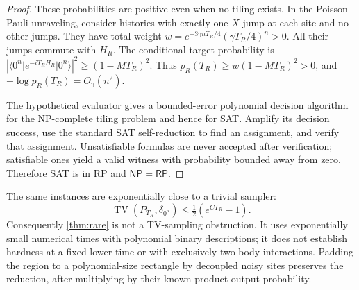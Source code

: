 \documentclass[11pt,reqno]{amsart}
\numberwithin{equation}{section}
\theoremstyle{definition}
\theoremstyle{remark}
\newcommand{\TV}{\operatorname{TV}}
\newcommand{\ket}[1]{\lvert#1\rangle}
\newcommand{\bra}[1]{\langle#1\rvert}
\begin{document}
\begin{proof}
These probabilities are positive even when no tiling exists. In the Poisson Pauli unraveling, consider histories with exactly one $X$ jump at each site and no other jumps. They have total weight
$w=e^{-3\gamma nT_R/4}(\gamma T_R/4)^n>0$.
All their jumps commute with $H_R$. The conditional target probability is
$|\bra{0^n}e^{-iT_RH_R}\ket{0^n}|^2\geq(1-MT_R)^2$.
Thus $p_R(T_R)\geq w(1-MT_R)^2>0$, and $-\log p_R(T_R)=O_\gamma(n^2)$.

The hypothetical evaluator gives a bounded-error polynomial decision algorithm for the NP-complete tiling problem and hence for SAT. Amplify its decision success, use the standard SAT self-reduction to find an assignment, and verify that assignment. Unsatisfiable formulas are never accepted after verification; satisfiable ones yield a valid witness with probability bounded away from zero. Therefore SAT is in RP and $\mathsf{NP}=\mathsf{RP}$.
\end{proof}

The same instances are exponentially close to a trivial sampler:
\begin{equation}\label{eq:trivialsampler}
 \TV(P_{T_R},\delta_{0^n})\leq\tfrac12(e^{CT_R}-1).
\end{equation}
Consequently \cref{thm:rare} is not a TV-sampling obstruction. It uses exponentially small numerical times with polynomial binary descriptions; it does not establish hardness at a fixed lower time or with exclusively two-body interactions. Padding the region to a polynomial-size rectangle by decoupled noisy sites preserves the reduction, after multiplying by their known product output probability.
\end{document}
